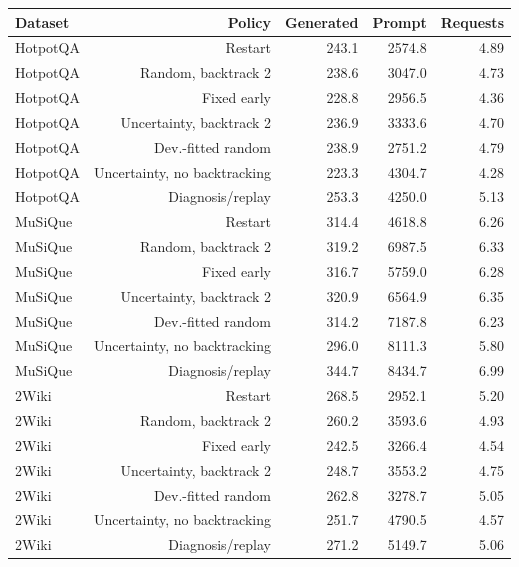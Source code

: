 \begin{tabular}{@{}lrrrr@{}}
\toprule
Dataset & Policy & Generated & Prompt & Requests \\
\midrule
HotpotQA & Restart & 243.1 & 2574.8 & 4.89 \\
HotpotQA & Random, backtrack 2 & 238.6 & 3047.0 & 4.73 \\
HotpotQA & Fixed early & 228.8 & 2956.5 & 4.36 \\
HotpotQA & Uncertainty, backtrack 2 & 236.9 & 3333.6 & 4.70 \\
HotpotQA & Dev.-fitted random & 238.9 & 2751.2 & 4.79 \\
HotpotQA & Uncertainty, no backtracking & 223.3 & 4304.7 & 4.28 \\
HotpotQA & Diagnosis/replay & 253.3 & 4250.0 & 5.13 \\
MuSiQue & Restart & 314.4 & 4618.8 & 6.26 \\
MuSiQue & Random, backtrack 2 & 319.2 & 6987.5 & 6.33 \\
MuSiQue & Fixed early & 316.7 & 5759.0 & 6.28 \\
MuSiQue & Uncertainty, backtrack 2 & 320.9 & 6564.9 & 6.35 \\
MuSiQue & Dev.-fitted random & 314.2 & 7187.8 & 6.23 \\
MuSiQue & Uncertainty, no backtracking & 296.0 & 8111.3 & 5.80 \\
MuSiQue & Diagnosis/replay & 344.7 & 8434.7 & 6.99 \\
2Wiki & Restart & 268.5 & 2952.1 & 5.20 \\
2Wiki & Random, backtrack 2 & 260.2 & 3593.6 & 4.93 \\
2Wiki & Fixed early & 242.5 & 3266.4 & 4.54 \\
2Wiki & Uncertainty, backtrack 2 & 248.7 & 3553.2 & 4.75 \\
2Wiki & Dev.-fitted random & 262.8 & 3278.7 & 5.05 \\
2Wiki & Uncertainty, no backtracking & 251.7 & 4790.5 & 4.57 \\
2Wiki & Diagnosis/replay & 271.2 & 5149.7 & 5.06 \\
\bottomrule
\end{tabular}
